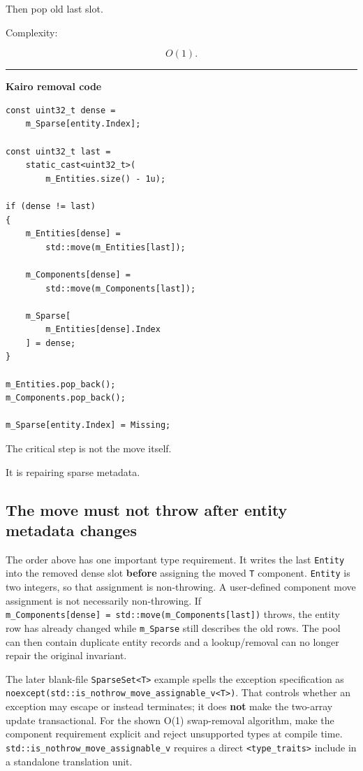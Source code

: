 Then pop old last slot.

Complexity:

\[
O(1).
\]

\begin{center}\rule{0.5\linewidth}{0.5pt}\end{center}

\textbf{Kairo removal code}

\begin{verbatim}
const uint32_t dense =
    m_Sparse[entity.Index];

const uint32_t last =
    static_cast<uint32_t>(
        m_Entities.size() - 1u);

if (dense != last)
{
    m_Entities[dense] =
        std::move(m_Entities[last]);

    m_Components[dense] =
        std::move(m_Components[last]);

    m_Sparse[
        m_Entities[dense].Index
    ] = dense;
}

m_Entities.pop_back();
m_Components.pop_back();

m_Sparse[entity.Index] = Missing;
\end{verbatim}

The critical step is not the move itself.

It is repairing sparse metadata.

\subsection{The move must not throw after entity metadata changes}\label{05-engine-i-ch015-the-move-must-not-throw-after-entity-metadata-changes}

\hypertarget{05-engine-i-ch015-the-move-must-not-throw-after-entity-metadata-changes}{}

The order above has one important type requirement. It writes the last \texttt{Entity} into the removed dense slot \textbf{before} assigning the moved \texttt{T} component. \texttt{Entity} is two integers, so that assignment is non-throwing. A user-defined component move assignment is not necessarily non-throwing. If \texttt{m\_Components{[}dense{]}\ =\ std::move(m\_Components{[}last{]})} throws, the entity row has already changed while \texttt{m\_Sparse} still describes the old rows. The pool can then contain duplicate entity records and a lookup/removal can no longer repair the original invariant.

The later blank-file \texttt{SparseSet\textless{}T\textgreater{}} example spells the exception specification as \texttt{noexcept(std::is\_nothrow\_move\_assignable\_v\textless{}T\textgreater{})}. That controls whether an exception may escape or instead terminates; it does \textbf{not} make the two-array update transactional. For the shown O(1) swap-removal algorithm, make the component requirement explicit and reject unsupported types at compile time. \texttt{std::is\_nothrow\_move\_assignable\_v} requires a direct \texttt{\textless{}type\_traits\textgreater{}} include in a standalone translation unit.

